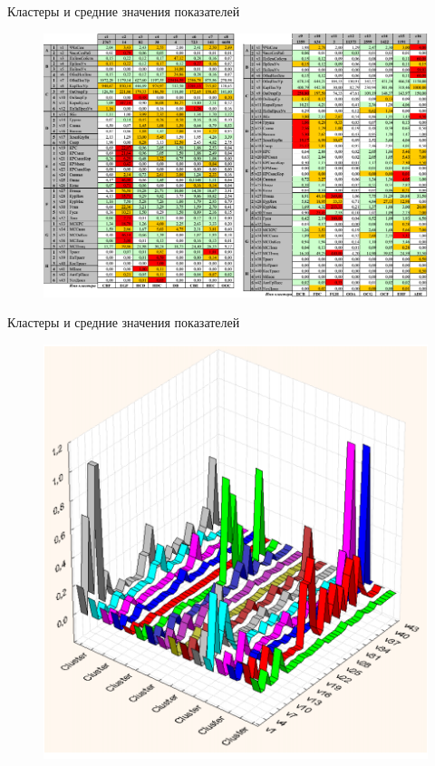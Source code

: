 \documentclass{beamer}
\begin{document}
\begin{frame}
Кластеры и средние значения показателей
\begin{figure}[h]
\centering
\includegraphics[scale=0.4]{images/lec07-pic43.png}
\end{figure}
\end{frame}

\begin{frame}
Кластеры и средние значения показателей
\begin{figure}[h]
\centering
\includegraphics[scale=0.5]{images/lec07-pic44.png}
\end{figure}
\end{frame}
\end{document}
